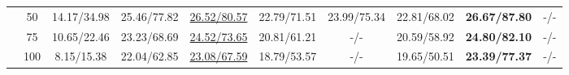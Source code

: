 \documentclass[10pt,journal,compsoc]{IEEEtran}
\newcommand\bdr[1]{{\textbf{#1}}}
\newcommand\bdb[1]{{\underline{#1}}}
\begin{document}
\begin{table*}[t!]
\begin{scriptsize}
\begin{center}
\begin{tabular}{l c c ccccccc}
& 50  & 14.17/34.98 & 25.46/77.82 & \bdb{26.52/80.57} & 22.79/71.51 & 23.99/75.34 & 22.81/68.02 & \bdr{26.67/87.80} & -/- \\

& 75  & 10.65/22.46 & 23.23/68.69 & \bdb{24.52/73.65} & 20.81/61.21 & -/- & 20.59/58.92 & \bdr{24.80/82.10} & -/- \\

& 100 & 8.15/15.38 & 22.04/62.85 & \bdb{23.08/67.59} & 18.79/53.57 & -/- & 19.65/50.51 & \bdr{23.39/77.37} & -/- \\

\hline


\end{tabular}\end{center}
\end{scriptsize}
\end{table*}
\end{document}
